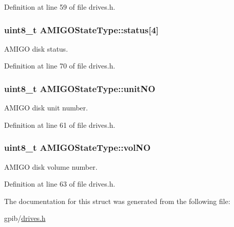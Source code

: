 Definition at line 59 of file drives.\+h.

\subsubsection[{\texorpdfstring{status}{status}}]{\setlength{\rightskip}{0pt plus 5cm}uint8\+\_\+t A\+M\+I\+G\+O\+State\+Type\+::status\mbox{[}4\mbox{]}}\hypertarget{structAMIGOStateType_a20ecb3cbbcb1fe4746c2d38edc125412}{}\label{structAMIGOStateType_a20ecb3cbbcb1fe4746c2d38edc125412}


A\+M\+I\+GO disk status. 



Definition at line 70 of file drives.\+h.

\subsubsection[{\texorpdfstring{unit\+NO}{unitNO}}]{\setlength{\rightskip}{0pt plus 5cm}uint8\+\_\+t A\+M\+I\+G\+O\+State\+Type\+::unit\+NO}\hypertarget{structAMIGOStateType_a3d0cc02f8822c817feddf93dd08a5034}{}\label{structAMIGOStateType_a3d0cc02f8822c817feddf93dd08a5034}


A\+M\+I\+GO disk unit number. 



Definition at line 61 of file drives.\+h.

\subsubsection[{\texorpdfstring{vol\+NO}{volNO}}]{\setlength{\rightskip}{0pt plus 5cm}uint8\+\_\+t A\+M\+I\+G\+O\+State\+Type\+::vol\+NO}\hypertarget{structAMIGOStateType_a9825e282ac5844225a43b7f0835da67f}{}\label{structAMIGOStateType_a9825e282ac5844225a43b7f0835da67f}


A\+M\+I\+GO disk volume number. 



Definition at line 63 of file drives.\+h.



The documentation for this struct was generated from the following file\+:\begin{DoxyCompactItemize}
\item 
gpib/\hyperlink{drives_8h}{drives.\+h}\end{DoxyCompactItemize}
